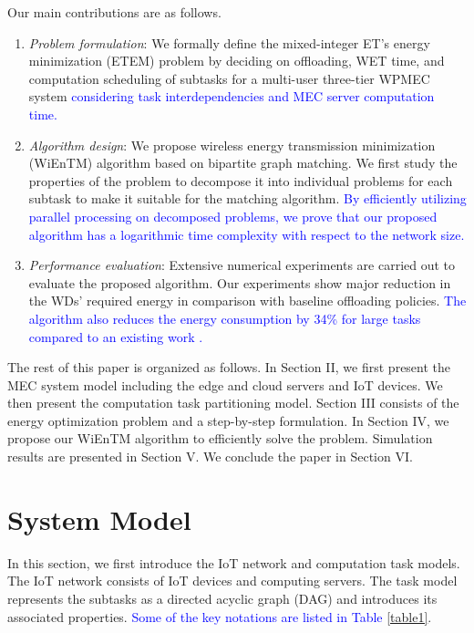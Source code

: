 \documentclass[12pt,draftclsnofoot,onecolumn]{IEEEtran}
\begin{document}
Our main contributions are as follows.
\begin{enumerate}
	\item \textit{Problem formulation}: We formally define the mixed-integer ET's energy minimization (ETEM) problem by deciding on offloading, WET time, and computation scheduling of subtasks for a multi-user three-tier WPMEC system \textcolor{blue}{considering task interdependencies and MEC server computation time.}
	\item \textit{Algorithm design}: We propose wireless energy transmission minimization (WiEnTM) algorithm based on bipartite graph matching. We first study the properties of the problem to decompose it into individual problems for each subtask to make it suitable for the matching algorithm. \textcolor{blue}{By efficiently utilizing parallel processing on decomposed problems, we prove that our proposed algorithm has a logarithmic time complexity with respect to the network size.}
	\item \textit{Performance evaluation}: Extensive numerical experiments are carried out to evaluate the proposed algorithm. Our experiments show major reduction in the WDs' required energy in comparison with baseline offloading policies. \textcolor{blue}{The algorithm also reduces the energy consumption by 34\% for large tasks compared to an existing work \cite{b13}.}
\end{enumerate}

The rest of this paper is organized as follows. In Section II, we first present the MEC system model including the edge and cloud servers and IoT devices. We then present the computation task partitioning model. Section III consists of the energy optimization problem and a step-by-step formulation. In Section IV, we propose our WiEnTM algorithm to efficiently solve the problem. Simulation results are presented in Section V. We conclude the paper in Section VI.

\section{System Model}
In this section, we first introduce the IoT network and computation task models. The IoT network consists of IoT devices and computing servers. The task model represents the subtasks as a directed acyclic graph (DAG) and introduces its associated properties. \textcolor{blue}{Some of the key notations are listed in Table \ref{table1}}.
\end{document}
